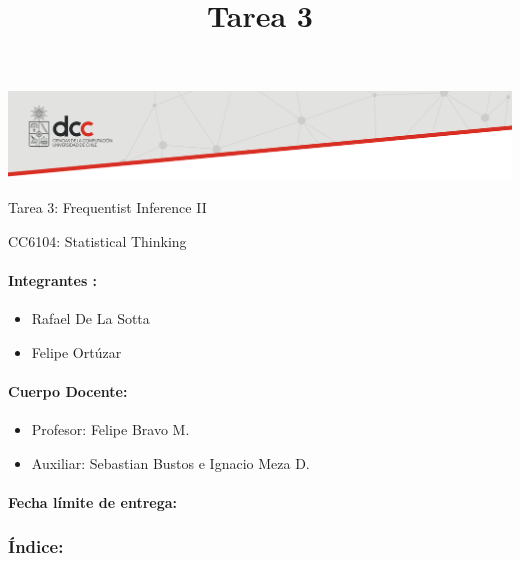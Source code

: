 \documentclass[]{article}
\title{Tarea 3}
\author{}
\date{}
\providecommand{\tightlist}{%
  \setlength{\itemsep}{0pt}\setlength{\parskip}{0pt}}
\let\oldparagraph\paragraph
\renewcommand{\paragraph}[1]{\oldparagraph{#1}\mbox{}}
\begin{document}
\maketitle

\includegraphics{banner.png}

Tarea 3: Frequentist Inference II

CC6104: Statistical Thinking

\hypertarget{integrantes}{%
\paragraph{\texorpdfstring{\textbf{Integrantes
:}}{Integrantes :}}\label{integrantes}}

\begin{itemize}
\tightlist
\item
  Rafael De La Sotta
\item
  Felipe Ortúzar
\end{itemize}

\hypertarget{cuerpo-docente}{%
\paragraph{\texorpdfstring{\textbf{Cuerpo
Docente:}}{Cuerpo Docente:}}\label{cuerpo-docente}}

\begin{itemize}
\tightlist
\item
  Profesor: Felipe Bravo M.
\item
  Auxiliar: Sebastian Bustos e Ignacio Meza D.
\end{itemize}

\hypertarget{fecha-limite-de-entrega}{%
\paragraph{\texorpdfstring{\textbf{Fecha límite de
entrega:}}{Fecha límite de entrega:}}\label{fecha-limite-de-entrega}}

\hypertarget{indice}{%
\subsubsection{\texorpdfstring{\textbf{Índice:}}{Índice:}}\label{indice}}
\end{document}
